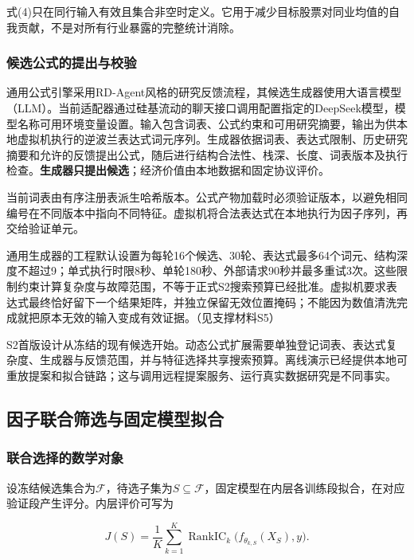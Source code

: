 \documentclass[UTF8,12pt,a4paper,fontset=none]{ctexart}
\begin{document}
式(4)只在同行输入有效且集合非空时定义。它用于减少目标股票对同业均值的自我贡献，不是对所有行业暴露的完整统计消除。


\subsubsection{候选公式的提出与校验}

通用公式引擎采用RD-Agent风格的研究反馈流程，其候选生成器使用大语言模型（LLM）。当前适配器通过硅基流动的聊天接口调用配置指定的DeepSeek模型，模型名称可用环境变量设置。输入包含词表、公式约束和可用研究摘要，输出为供本地虚拟机执行的逆波兰表达式词元序列。生成器依据词表、表达式限制、历史研究摘要和允许的反馈提出公式，随后进行结构合法性、栈深、长度、词表版本及执行检查。\textbf{生成器只提出候选}；经济价值由本地数据和固定协议评价。


当前词表由有序注册表派生哈希版本。公式产物加载时必须验证版本，以避免相同编号在不同版本中指向不同特征。虚拟机将合法表达式在本地执行为因子序列，再交给验证单元。


通用生成器的工程默认设置为每轮16个候选、30轮、表达式最多64个词元、结构深度不超过9；单式执行时限8秒、单轮180秒、外部请求90秒并最多重试3次。这些限制约束计算复杂度与故障范围，不等于正式S2搜索预算已经批准。虚拟机要求表达式最终恰好留下一个结果矩阵，并独立保留无效位置掩码；不能因为数值清洗完成就把原本无效的输入变成有效证据。（见支撑材料S5）


S2首版设计从冻结的现有候选开始。动态公式扩展需要单独登记词表、表达式复杂度、生成器与反馈范围，并与特征选择共享搜索预算。离线演示已经提供本地可重放提案和拟合链路；这与调用远程提案服务、运行真实数据研究是不同事实。


\subsection{因子联合筛选与固定模型拟合}

\subsubsection{联合选择的数学对象}

设冻结候选集合为$\mathcal F$，待选子集为$S\subseteq\mathcal F$，固定模型在内层各训练段拟合，在对应验证段产生评分。内层评价可写为


\begin{equation}
 J(S)=\frac{1}{K}\sum_{k=1}^{K}\operatorname{RankIC}_k\bigl(f_{\theta_{k,S}}(X_S),y\bigr). \tag{5}
\end{equation}
\end{document}
